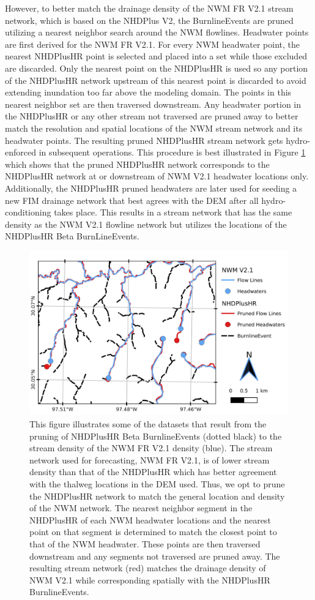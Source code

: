 \documentclass[draft]{dependencies/agujournal2019}
\begin{document}
However, to better match the drainage density of the NWM FR V2.1 stream network, which is based on the NHDPlus V2, the BurnlineEvents are pruned utilizing a nearest neighbor search around the NWM flowlines.
Headwater points are first derived for the NWM FR V2.1.
For every NWM headwater point, the nearest NHDPlusHR point is selected and placed into a set while those excluded are discarded.
Only the nearest point on the NHDPlusHR is used so any portion of the NHDPlusHR network upstream of this nearest point is discarded to avoid extending inundation too far above the modeling domain.
The points in this nearest neighbor set are then traversed downstream.
Any headwater portion in the NHDPlusHR or any other stream not traversed are pruned away to better match the resolution and spatial locations of the NWM stream network and its headwater points.
The resulting pruned NHDPlusHR stream network gets hydro-enforced in subsequent operations.
This procedure is best illustrated in Figure \ref{fig:stream_density_pruning} which shows that the pruned NHDPlusHR network corresponds to the NHDPlusHR network at or downstream of NWM V2.1 headwater locations only. 
Additionally, the NHDPlusHR pruned headwaters are later used for seeding a new FIM drainage network that best agrees with the DEM after all hydro-conditioning takes place.
This results in a stream network that has the same density as the NWM V2.1 flowline network but utilizes the locations of the NHDPlusHR Beta BurnLineEvents. 
%
\begin{figure}[H]
\centering
\includegraphics[scale=1.0]{figures/headwaters.jpg}
\caption{This figure illustrates some of the datasets that result from the pruning of NHDPlusHR Beta BurnlineEvents (dotted black) to the stream density of the NWM FR V2.1 density (blue).
The stream network used for forecasting, NWM FR V2.1, is of lower stream density than that of the NHDPlusHR which has better agreement with the thalweg locations in the DEM used.
Thus, we opt to prune the NHDPlusHR network to match the general location and density of the NWM network.
The nearest neighbor segment in the NHDPlusHR of each NWM headwater locations and the nearest point on that segment is determined to match the closest point to that of the NWM headwater.
These points are then traversed downstream and any segments not traversed are pruned away.
The resulting stream network (red) matches the drainage density of NWM V2.1 while corresponding spatially with the NHDPlusHR BurnlineEvents.}
\label{fig:stream_density_pruning}
\end{figure}
\end{document}
